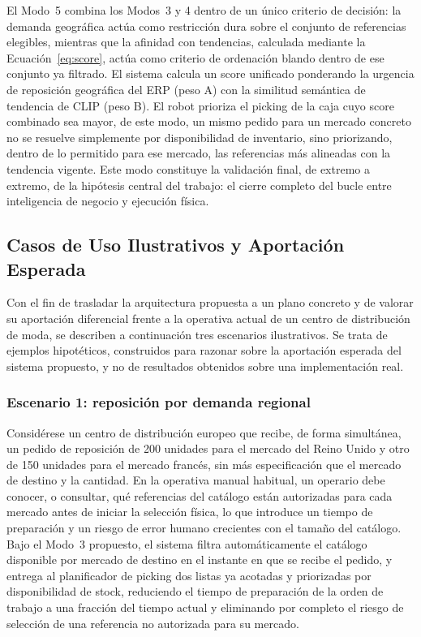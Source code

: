 \documentclass[conference]{IEEEtran}
\begin{document}
El Modo~5 combina los Modos~3 y 4 dentro de un único criterio de decisión:
la demanda geográfica actúa como restricción dura sobre el conjunto de
referencias elegibles, mientras que la afinidad con tendencias, calculada
mediante la Ecuación~\eqref{eq:score}, actúa como criterio de ordenación
blando dentro de ese conjunto ya filtrado. El sistema calcula un score unificado ponderando la urgencia de reposición geográfica del ERP (peso A) con la similitud semántica de tendencia de CLIP (peso B). El robot prioriza el picking de la caja cuyo score combinado sea mayor, de este modo, un mismo pedido para
un mercado concreto no se resuelve simplemente por disponibilidad de
inventario, sino priorizando, dentro de lo permitido para ese mercado, las
referencias más alineadas con la tendencia vigente. Este modo constituye la
validación final, de extremo a extremo, de la hipótesis central del
trabajo: el cierre completo del bucle entre inteligencia de negocio y
ejecución física.


\subsection{Casos de Uso Ilustrativos y Aportación Esperada}
\label{sec:usecases}

Con el fin de trasladar la arquitectura propuesta a un plano concreto y de
valorar su aportación diferencial frente a la operativa actual de un centro
de distribución de moda, se describen a continuación tres escenarios
ilustrativos. Se trata de ejemplos hipotéticos, construidos para razonar
sobre la aportación esperada del sistema propuesto, y no de resultados
obtenidos sobre una implementación real.

\subsubsection{Escenario 1: reposición por demanda regional}

Considérese un centro de distribución europeo que recibe, de forma
simultánea, un pedido de reposición de 200 unidades para el mercado del
Reino Unido y otro de 150 unidades para el mercado francés, sin más
especificación que el mercado de destino y la cantidad. En la operativa
manual habitual, un operario debe conocer, o consultar, qué referencias del
catálogo están autorizadas para cada mercado antes de iniciar la selección
física, lo que introduce un tiempo de preparación y un riesgo de error
humano crecientes con el tamaño del catálogo. Bajo el Modo~3 propuesto, el
sistema filtra automáticamente el catálogo disponible por mercado de destino
en el instante en que se recibe el pedido, y entrega al planificador de
picking dos listas ya acotadas y priorizadas por disponibilidad de stock,
reduciendo el tiempo de preparación de la orden de trabajo a una fracción del
tiempo actual y eliminando por completo el riesgo de selección de una
referencia no autorizada para su mercado.
\end{document}
